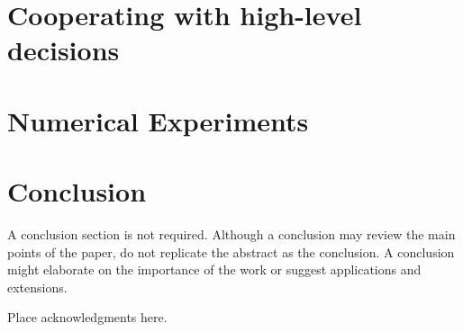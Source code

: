 \documentclass{ifacconf}
\begin{document}
\section{Cooperating with high-level decisions}

\section{Numerical Experiments}

\section{Conclusion}

A conclusion section is not required. Although a conclusion may review
the main points of the paper, do not replicate the abstract as the
conclusion. A conclusion might elaborate on the importance of the work
or suggest applications and extensions.

\begin{ack}
Place acknowledgments here.
\end{ack}

\end{document}
